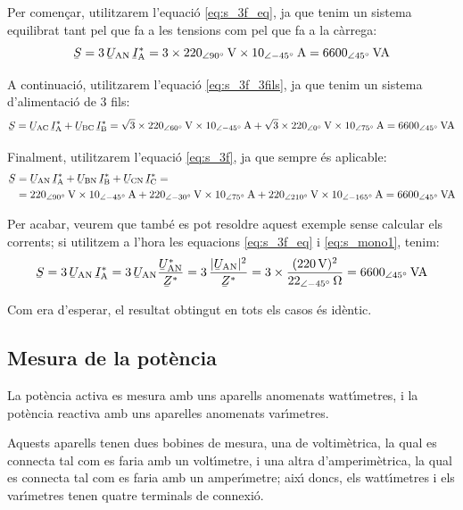 \begin{exemple}
    Per comen\c{c}ar,  utilitzarem l'equaci\'{o} \eqref{eq:s_3f_eq}, ja que tenim
    un sistema equilibrat tant pel que fa a les tensions com pel que fa a la c\`{a}rrega:
    \[
    \cmplx{S} = 3\,\cmplx{U}\ped{AN} \,\cmplx{I}\ped{A}^* =
    3\times \SIpd{220}{90}{V} \times
    \SIpd{10}{-45}{A} = \SIpd{6600}{45}{VA}
    \]

    A continuaci\'{o},  utilitzarem l'equaci\'{o} \eqref{eq:s_3f_3fils}, ja que tenim
    un sistema d'alimentaci\'{o} de 3 fils:
    \[
    \cmplx{S} = \cmplx{U}\ped{AC} \,\cmplx{I}\ped{A}^*
     +  \cmplx{U}\ped{BC} \,\cmplx{I}\ped{B}^* =
    \sqrt{3}\times \SIpd{220}{60}{V} \times
    \SIpd{10}{-45}{A} + \sqrt{3}\times \SIpd{220}{0}{V}
    \times \SIpd{10}{75}{A}  = \SIpd{6600}{45}{VA}
    \]

     Finalment,  utilitzarem l'equaci\'{o} \eqref{eq:s_3f}, ja que
     sempre \'{e}s aplicable:
     \[\begin{split}
     \cmplx{S} &=  \cmplx{U}\ped{AN} \,\cmplx{I}\ped{A}^* +
     \cmplx{U}\ped{BN} \,\cmplx{I}\ped{B}^* +  \cmplx{U}\ped{CN}\,
     \cmplx{I}\ped{C}^* =\\
     &= \SIpd{220}{90}{V}
     \times \SIpd{10}{-45}{A} + \SIpd{220}{-30}{V} \times \SIpd{10}{75}{A}
     + \SIpd{220}{210}{V} \times \SIpd{10}{-165}{A} = \SIpd{6600}{45}{VA}
     \end{split} \]

    Per acabar, veurem que tamb\'{e} es pot resoldre aquest exemple
    sense calcular els corrents; si utilitzem a l'hora les
    equacions \eqref{eq:s_3f_eq} i \eqref{eq:s_mono1}, tenim:
    \[
    \cmplx{S} = 3\,\cmplx{U}\ped{AN} \,\cmplx{I}\ped{A}^* =
    3\,\cmplx{U}\ped{AN}\frac{\cmplx{U}\ped{AN}^*}{\cmplx{Z}^*} =
    3\, \frac{|\cmplx{U}\ped{AN}|^2}{\cmplx{Z}^*} =
    3\times\frac{(\SI{220}{V})^2}{\SIpd{22}{-45}{\ohm}} =
    \SIpd{6600}{45}{VA}
    \]

    Com era d'esperar, el resultat obtingut en tots els casos
    \'{e}s id\`{e}ntic.
\end{exemple}

\subsection{Mesura de la pot\`{e}ncia}

La pot\`{e}ncia activa es mesura amb uns aparells anomenats watt\'{\i}metres,
i la pot\`{e}ncia reactiva amb uns aparelles anomenats var\'{\i}metres.

Aquests aparells tenen dues bobines de mesura, una de voltim\`{e}trica,
la qual es connecta tal com es faria amb un volt\'{\i}metre, i una altra
d'amperim\`{e}trica, la qual es connecta tal com es faria amb un
amper\'{\i}metre; aix\'{\i} doncs, els watt\'{\i}metres i els var\'{\i}metres tenen
quatre terminals de connexi\'{o}.

